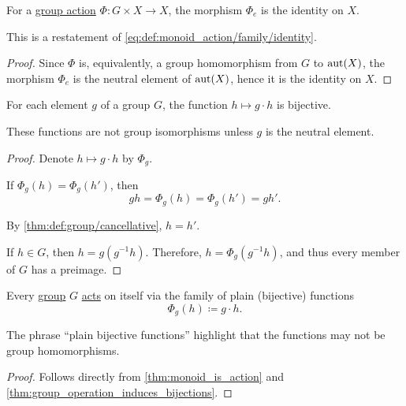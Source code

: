 \begin{proposition}\label{thm:group_action_of_neutral_element}
  For a \hyperref[def:group_action]{group action} \( \Phi: G \times X \to X \), the morphism \( \Phi_e \) is the identity on \( X \).
\end{proposition}
\begin{comments}
  \item This is a restatement of \eqref{eq:def:monoid_action/family/identity}.
\end{comments}
\begin{proof}
  Since \( \Phi \) is, equivalently, a group homomorphism from \( G \) to \( \operatorname{aut}(X) \), the morphism \( \Phi_e \) is the neutral element of \( \operatorname{aut}(X) \), hence it is the identity on \( X \).
\end{proof}

\begin{lemma}\label{thm:group_operation_induces_bijections}
  For each element \( g \) of a group \( G \), the function \( h \mapsto g \cdot h \) is bijective.
\end{lemma}
\begin{comments}
  \item These functions are not group isomorphisms unless \( g \) is the neutral element.
\end{comments}
\begin{proof}
  Denote \( h \mapsto g \cdot h \) by \( \Phi_g \).

   If \( \Phi_g(h) = \Phi_g(h') \), then
  \begin{equation*}
    gh = \Phi_g(h) = \Phi_g(h') = gh'.
  \end{equation*}

  By \cref{thm:def:group/cancellative}, \( h = h' \).

   If \( h \in G \), then \( h = g(g^{-1} h) \). Therefore, \( h = \Phi_g(g^{-1} h) \), and thus every member of \( G \) has a preimage.
\end{proof}

\begin{proposition}\label{thm:group_is_action}
  Every \hyperref[def:group]{group} \( G \) \hyperref[def:group_action]{acts} on itself via the family of plain (bijective) functions
  \begin{equation*}
    \Phi_g(h) \coloneqq g \cdot h.
  \end{equation*}
\end{proposition}
\begin{comments}
  \item The phrase \enquote{plain bijective functions} highlight that the functions may not be group homomorphisms.
\end{comments}
\begin{proof}
  Follows directly from \cref{thm:monoid_is_action} and \cref{thm:group_operation_induces_bijections}.
\end{proof}

